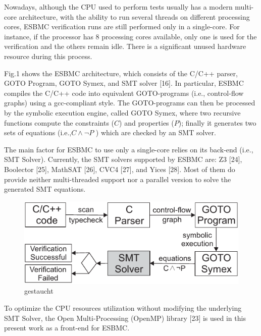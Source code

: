 Nowadays, although the CPU used to perform tests usually has a modern multi-core architecture, with the ability to run several threads on different processing cores, ESBMC verification runs are still performed only in a single-core. For instance, if the processor has 8 processing cores available, only one is used for the verification and the others remain idle. There is a significant unused hardware resource during this process.

Fig.1 shows the ESBMC architecture, which consists of the C/C++ parser, GOTO Program, GOTO Symex, and SMT solver [16]. In particular, ESBMC compiles the C/C++ code into equivalent GOTO\hyp{}programs (i.e., control-flow graphs) using a gcc-compliant style. The GOTO-programs can then be processed by the symbolic execution engine, called GOTO Symex, where two recursive functions compute the constraints ($ C $) and properties ($ P $); finally it generates two sets of equations (i.e.,\:$ C \land \neg P $ ) which are checked by an SMT solver. 

The main factor for ESBMC to use only a single-core relies on its back-end (i.e., SMT Solver). Currently, the SMT solvers supported by ESBMC are: Z3 [24], Boolector [25], MathSAT [26], CVC4 [27], and Yices [28]. Most of them do provide neither multi-threaded support nor a parallel version to solve the generated SMT equations.
\begin{figure}[ht]
	\centering
  \includegraphics[scale=0.9]{Image/esbmc-arch-new.pdf} 
	\caption{gestaucht}
\end{figure}

To optimize the CPU resources utilization without modifying the underlying SMT Solver, the Open Multi-Processing (OpenMP) library [23] is used in this present work as a front-end for ESBMC.


